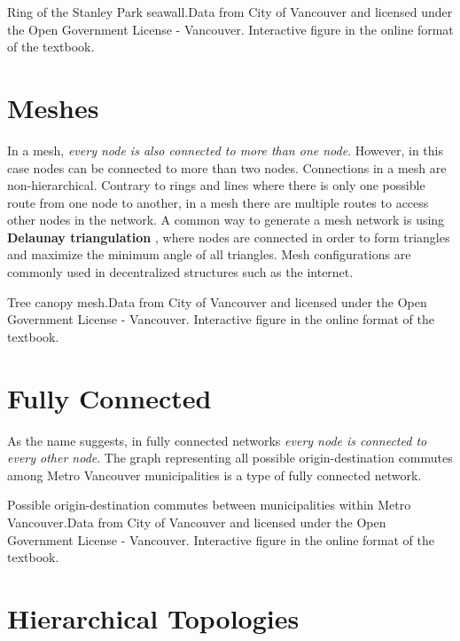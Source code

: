 \documentclass[
]{book}
\begin{document}
\label{fig:unnamed-chunk-14}Ring of the Stanley Park seawall.Data from City of Vancouver and licensed under the Open Government License - Vancouver. Interactive figure in the online format of the textbook.

\hypertarget{meshes}{%
\section{Meshes}\label{meshes}}

In a mesh, \emph{every node is also connected to more than one node}. However, in this case nodes can be connected to more than two nodes. Connections in a mesh are non-hierarchical. Contrary to rings and lines where there is only one possible route from one node to another, in a mesh there are multiple routes to access other nodes in the network. A common way to generate a mesh network is using \textbf{Delaunay triangulation} \citep{wikimediaDelaunayTriangulation2021}, where nodes are connected in order to form triangles and maximize the minimum angle of all triangles. Mesh configurations are commonly used in decentralized structures such as the internet.

\label{fig:unnamed-chunk-15}Tree canopy mesh.Data from City of Vancouver and licensed under the Open Government License - Vancouver. Interactive figure in the online format of the textbook.

\hypertarget{fully-connected}{%
\section{Fully Connected}\label{fully-connected}}

As the name suggests, in fully connected networks \emph{every node is connected to every other node}. The graph representing all possible origin-destination commutes among Metro Vancouver municipalities is a type of fully connected network.

\label{fig:unnamed-chunk-16}Possible origin-destination commutes between municipalities within Metro Vancouver.Data from City of Vancouver and licensed under the Open Government License - Vancouver. Interactive figure in the online format of the textbook.

\hypertarget{hierarchical-topologies}{%
\section{Hierarchical Topologies}\label{hierarchical-topologies}}
\end{document}
